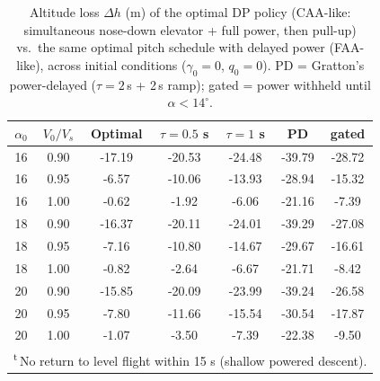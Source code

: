 \begin{table}[hbt!]
    \centering
    \caption{Altitude loss $\Delta h$ (m) of the optimal DP policy (CAA-like:
    simultaneous nose-down elevator + full power, then pull-up) vs.\ the same
    optimal pitch schedule with delayed power (FAA-like), across initial
    conditions ($\gamma_0=0$, $q_0=0$). PD = Gratton's power-delayed
    ($\tau=2$\,s + 2\,s ramp); gated = power withheld until $\alpha<14^\circ$.}
    \label{tab:caa_vs_faa}
    \begin{tabular}{ccccccc}
        \hline
        $\alpha_0$ & $V_0/V_s$ & Optimal & $\tau{=}0.5$ s & $\tau{=}1$ s & PD & gated \\
        \hline
        16 & 0.90 & -17.19 & -20.53 & -24.48 & -39.79 & -28.72 \\
        16 & 0.95 & -6.57 & -10.06 & -13.93 & -28.94 & -15.32 \\
        16 & 1.00 & -0.62 & -1.92 & -6.06 & -21.16 & -7.39 \\
        18 & 0.90 & -16.37 & -20.11 & -24.01 & -39.29 & -27.08 \\
        18 & 0.95 & -7.16 & -10.80 & -14.67 & -29.67 & -16.61 \\
        18 & 1.00 & -0.82 & -2.64 & -6.67 & -21.71 & -8.42 \\
        20 & 0.90 & -15.85 & -20.09 & -23.99 & -39.24 & -26.58 \\
        20 & 0.95 & -7.80 & -11.66 & -15.54 & -30.54 & -17.87 \\
        20 & 1.00 & -1.07 & -3.50 & -7.39 & -22.38 & -9.50 \\
        \hline
        \multicolumn{7}{l}{\footnotesize\textsuperscript{t}\,No return to level flight within 15 s (shallow powered descent).}\\
    \end{tabular}
\end{table}
